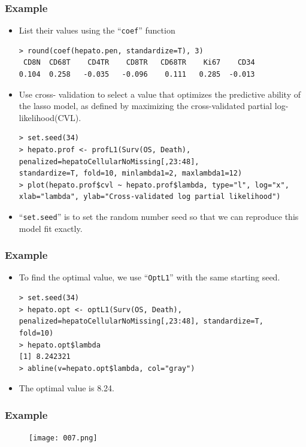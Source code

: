 \documentclass{beamer}
\begin{document}
\pagebreak
\begin{frame}[fragile]
\frametitle{Example}
\begin{itemize}
\item List their values using the ``\texttt{coef}'' function
\begin{Verbatim}
> round(coef(hepato.pen, standardize=T), 3)
 CD8N  CD68T    CD4TR    CD8TR   CD68TR    Ki67    CD34 
0.104  0.258   -0.035   -0.096    0.111   0.285  -0.013
\end{Verbatim}
\item Use cross- validation to select a value that optimizes the predictive ability of the lasso model, as defined by maximizing the cross-validated partial log-likelihood(CVL).
\begin{Verbatim}
> set.seed(34)
> hepato.prof <- profL1(Surv(OS, Death),
penalized=hepatoCellularNoMissing[,23:48],
standardize=T, fold=10, minlambda1=2, maxlambda1=12)
> plot(hepato.prof$cvl ~ hepato.prof$lambda, type="l", log="x",
xlab="lambda", ylab="Cross-validated log partial likelihood")
\end{Verbatim}
\item ``\texttt{set.seed}''  is to set the random number seed so that we can reproduce this model fit exactly.
\end{itemize}
\end{frame}

\pagebreak
\begin{frame}[fragile]
\frametitle{Example}
\begin{itemize}
\item To find the optimal value, we use ``\texttt{OptL1}'' with the same starting seed.
\begin{Verbatim}
> set.seed(34)
> hepato.opt <- optL1(Surv(OS, Death),
penalized=hepatoCellularNoMissing[,23:48], standardize=T,
fold=10)
> hepato.opt$lambda
[1] 8.242321
> abline(v=hepato.opt$lambda, col="gray")
\end{Verbatim}
\item The optimal value is 8.24.
\end{itemize}
\end{frame}

\pagebreak
\begin{frame}
\frametitle{Example}
\begin{figure}[h!]
\texttt{[image: 007.png]}
\end{figure}
\end{frame}
\end{document}
